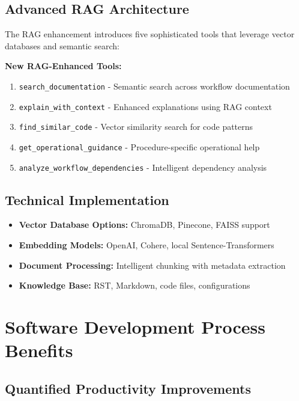 \documentclass[11pt,letterpaper]{article}
\begin{document}
\subsection{Advanced RAG Architecture}
The RAG enhancement introduces five sophisticated tools that leverage vector databases and semantic search:

\begin{benefitbox}
\textbf{New RAG-Enhanced Tools:}
\begin{enumerate}
    \item \texttt{search\_documentation} - Semantic search across workflow documentation
    \item \texttt{explain\_with\_context} - Enhanced explanations using RAG context
    \item \texttt{find\_similar\_code} - Vector similarity search for code patterns
    \item \texttt{get\_operational\_guidance} - Procedure-specific operational help
    \item \texttt{analyze\_workflow\_dependencies} - Intelligent dependency analysis
\end{enumerate}
\end{benefitbox}

\subsection{Technical Implementation}
\begin{itemize}
    \item \textbf{Vector Database Options:} ChromaDB, Pinecone, FAISS support
    \item \textbf{Embedding Models:} OpenAI, Cohere, local Sentence-Transformers
    \item \textbf{Document Processing:} Intelligent chunking with metadata extraction
    \item \textbf{Knowledge Base:} RST, Markdown, code files, configurations
\end{itemize}

\section{Software Development Process Benefits}

\subsection{Quantified Productivity Improvements}
\end{document}
